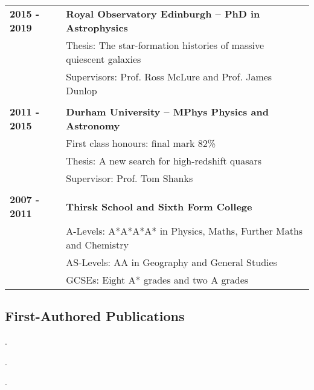 \documentclass[a4paper,fleqn,usenatbib,onecolumn]{mnras}
\title[Adam Carnall]{\center{Adam Carnall}}
\author[Adam Carnall]{PhD Student, Institute for Astronomy, Royal Observatory Edinburgh, EH9 3HJ, adamc@roe.ac.uk
\\
}
\begin{document}
\maketitle



\large

\begingroup
\setlength{\tabcolsep}{0pt} %
\renewcommand{\arraystretch}{1.1} %
\begin{tabular}{ p{3cm} p{14cm} }
\\
\bf{2015 - 2019} & \bf{Royal Observatory Edinburgh -- PhD in Astrophysics}\\
& Thesis: The star-formation histories of massive quiescent galaxies \\
& Supervisors: Prof. Ross McLure and Prof. James Dunlop\\
\\
\bf{2011 - 2015} & \bf{Durham University -- MPhys Physics and Astronomy} \\          
& First class honours: final mark 82\% \\
& Thesis: A new search for high-redshift quasars\\
& Supervisor: Prof. Tom Shanks\\
\\
\bf{2007 - 2011} &  \bf{Thirsk School and Sixth Form College} \\
 & A-Levels: A*A*A*A* in Physics, Maths, Further Maths and Chemistry \\
  & AS-Levels: AA in Geography and General Studies \\
 & GCSEs: Eight A* grades and two A grades
\end{tabular}
\endgroup

\subsection*{First-Authored Publications}


\hangindent=0.45cm . 

\medskip
\medskip

\hangindent=0.45cm . 

\medskip
\medskip

\hangindent=0.45cm . 
\end{document}
